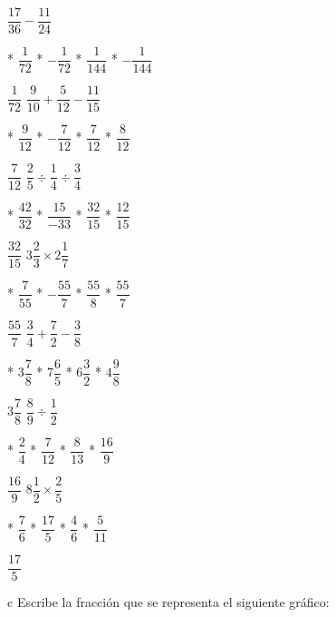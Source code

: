 $\dfrac{17}{36}-\dfrac{11}{24}$
\begin{enum}
	* $\dfrac{1}{72}$
	* $-\dfrac{1}{72}$
	* $\dfrac{1}{144}$
	* $-\dfrac{1}{144}$
\end{enum}
$\dfrac{1}{72}$
$\dfrac{9}{10}+\dfrac{5}{12}-\dfrac{11}{15}$
\begin{enum}
	* $\dfrac{9}{12}$
	* $-\dfrac{7}{12}$
	* $\dfrac{7}{12}$
	* $\dfrac{8}{12}$
\end{enum}
$\dfrac{7}{12}$
$\dfrac{2}{5}\div\dfrac{1}{4}\div\dfrac{3}{4}$
\begin{enum}
	* $\dfrac{42}{32}$
	* $\dfrac{15}{-33}$
	* $\dfrac{32}{15}$
	* $\dfrac{12}{15}$
\end{enum}
$\dfrac{32}{15}$
$3\dfrac{2}{3}\times 2\dfrac{1}{7}$
\begin{enum}
	* $\dfrac{7}{55}$
	* $-\dfrac{55}{7}$
	* $\dfrac{55}{8}$
	* $\dfrac{55}{7}$
\end{enum}
$\dfrac{55}{7}$
$\dfrac{3}{4}+\dfrac{7}{2}-\dfrac{3}{8}$
\begin{enum}
	* $3\dfrac{7}{8}$
	* $7\dfrac{6}{5}$
	* $6\dfrac{3}{2}$
	* $4\dfrac{9}{8}$
\end{enum}
$3\dfrac{7}{8}$
$\dfrac{8}{9}\div\dfrac{1}{2}$
\begin{enum}
	* $\dfrac{2}{4}$
	* $\dfrac{7}{12}$
	* $\dfrac{8}{13}$
	* $\dfrac{16}{9}$
\end{enum}
$\dfrac{16}{9}$
$8\dfrac{1}{2}\times\dfrac{2}{5}$
\begin{enum}
	* $\dfrac{7}{6}$
	* $\dfrac{17}{5}$
	* $\dfrac{4}{6}$
	* $\dfrac{5}{11}$
\end{enum}
$\dfrac{17}{5}$
\begin{tabular}{c}
	Escribe la fracci\'on que se representa el siguiente gr\'afico: \vspace{5pt} \\
	\begin{tikzpicture}[fill=blue!20,draw=blue!60,thick]
		\matrix[matrix of nodes, nodes={draw,minimum size=1cm}, nodes in empty cells,column sep=-\pgflinewidth,row sep=-\pgflinewidth]{
			|[fill]| & |[fill]| &          & |[fill]| & |[fill]| \\
			         & |[fill]| & |[fill]| & |[fill]| &          \\
			         & |[fill]| & |[fill]| & |[fill]| &          \\
			|[fill]| & |[fill]| &          & |[fill]| & |[fill]| \\
		};
	\end{tikzpicture}
\end{tabular}
